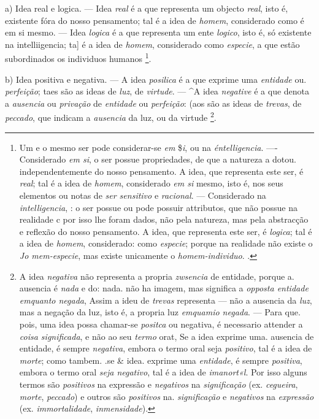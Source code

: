 a) Idea real e logica. --- Idea \emph{real} é a que representa um objecto \emph{real}, isto é, existente fóra do nosso pensamento; tal é a idea de \emph{homem}, considerado como é em si mesmo. --- Idea \emph{logica} é a que representa um ente \emph{logico}, isto é, só existente na intelliigencia; ta] é a idea de \emph{homem}, considerado como \emph{especie}, a que estão subordinados os individuos humanos \footnote{Um e o mesmo ser pode considerar-se \emph{em} \$\emph{i}, ou na \emph{éntelligencia}. ---- Considerado \emph{em si}, o ser possue propriedades, de que a natureza a dotou. independentemente do nosso pensamento. A idea, que representa este ser, é \emph{real}; tal é a idea de \emph{homem}, considerado \emph{em si} mesmo, isto é, nos seus elementos ou notas de \emph{ser sensitivo} e \emph{racional}. --- Considerado na \emph{intelligencia}, : o ser possue ou pode possuir attributos, que não possue na realidade c por isso lhe foram dados, não pela natureza, mas pela abstracção e reflexão do nosso pensamento. A idea, que representa este ser, é \emph{logica}; tal é a idea de \emph{homem}, considerado: como \emph{especie}; porque na realidade não existe o \emph{Jo mem-especie}, mas existe unicamente o \emph{homem-individuo}. .}.

b) Idea positiva e negativa. --- A idea \emph{posilica} é a que exprime uma \emph{entidade} ou. \emph{perfeição}; taes são as ideas de \emph{luz}, de \emph{virtude}. --- \textasciicircum{}A idea \emph{negative} é a que denota a \emph{ausencia} ou \emph{privação} de \emph{entidade} ou \emph{perfeição}: (aos são as ideas de \emph{trevas}, de \emph{peccado}, que indicam a \emph{ausencia} da luz, ou da virtude \footnote{A idea \emph{negativa} não representa a propria \emph{zwsencia} de entidade, porque a. ausencia é \emph{nada} e do: nada. não ha imagem, mas significa a \emph{opposta entidade emquanto negada}, Assim a ideu de \emph{trevas} representa --- não a ausencia da \emph{luz}, mas a negação da luz, isto é, a propria luz \emph{emquamio negada}. --- Para que. pois, uma idea possa chamar-se \emph{positca} ou negativa, é necessario attender a \emph{coisa significada}, e não ao seu \emph{termo} orat, Se a idea exprime uma. ausencia de entidade, é sempre \emph{negativa}, embora o termo oral seja \emph{positivo}, tal é a idea de \emph{morte}; como tambem. .se \& idea. exprime uma \emph{entidade}, é sempre \emph{positiva}, embora o termo oral \emph{seja negativo}, tal é a idea de \emph{imanort«l}. Por isso alguns termos são \emph{positivos} na expressão e \emph{negativos} na \emph{significação} (ex. \emph{cegueira}, \emph{morte}, \emph{peccado}) e outros são \emph{positivos} na. \emph{significação} e \emph{negativos} na \emph{expressão} (ex. \emph{immortalidade}, \emph{inmensidade}).}.


